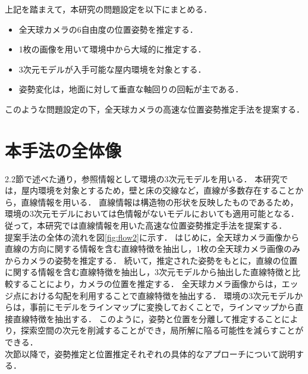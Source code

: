 上記を踏まえて，本研究の問題設定を以下にまとめる．
\begin{itemize}
  \item 全天球カメラの6自由度の位置姿勢を推定する．
  \item 1枚の画像を用いて環境中から大域的に推定する．
  \item 3次元モデルが入手可能な屋内環境を対象とする．
  \item 姿勢変化は，地面に対して垂直な軸回りの回転が主である．
\end{itemize}

このような問題設定の下，全天球カメラの高速な位置姿勢推定手法を提案する．

\clearpage
\section{本手法の全体像}

2.2節で述べた通り，参照情報として環境の3次元モデルを用いる．
本研究では，屋内環境を対象とするため，壁と床の交線など，直線が多数存在することから，直線情報を用いる．
直線情報は構造物の形状を反映したものであるため，環境の3次元モデルにおいては色情報がないモデルにおいても適用可能となる．
従って，本研究では直線情報を用いた高速な位置姿勢推定手法を提案する．
\\

提案手法の全体の流れを図\ref{fig:flow2}に示す．
はじめに，全天球カメラ画像から直線の方向に関する情報を含む直線特徴を抽出し，1枚の全天球カメラ画像のみからカメラの姿勢を推定する．
続いて，推定された姿勢をもとに，直線の位置に関する情報を含む直線特徴を抽出し，3次元モデルから抽出した直線特徴と比較することにより，カメラの位置を推定する．
全天球カメラ画像からは，エッジ点における勾配を利用することで直線特徴を抽出する．
環境の3次元モデルからは，事前にモデルをラインマップに変換しておくことで，ラインマップから直接直線特徴を抽出する．
このように，姿勢と位置を分離して推定することにより，探索空間の次元を削減することができ，局所解に陥る可能性を減らすことができる．
\\

次節以降で，姿勢推定と位置推定それぞれの具体的なアプローチについて説明する．



